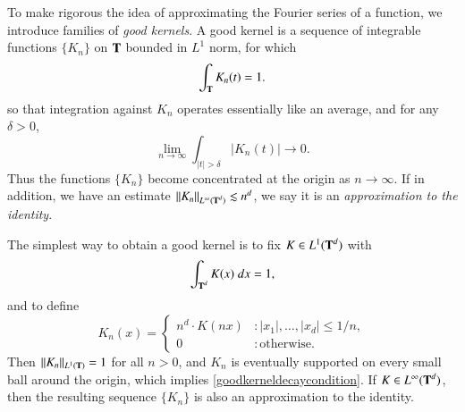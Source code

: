 To make rigorous the idea of approximating the Fourier series of a function, we introduce families of \emph{good kernels}. A good kernel is a sequence of integrable functions $\{ K_n \}$ on $\operatorname{\mathbf{T}}$ bounded in $L^1$ norm, for which
%
\[ \int_{\operatorname{\mathbf{T}}} K_n(t) = 1. \]
%
so that integration against $K_n$ operates essentially like an average, and for any $\delta > 0$,
%
\begin{equation} \label{goodkerneldecaycondition}
    \lim_{n \to \infty} \int_{|t| > \delta} |K_n(t)| \to 0.
\end{equation}
%
Thus the functions $\{ K_n \}$ become concentrated at the origin as $n \to \infty$. If in addition, we have an estimate $\| K_n \|_{L^\infty(\operatorname{\mathbf{T}}^d)} \lesssim n^d$, we say it is an \emph{approximation to the identity}.

\begin{example}
    The simplest way to obtain a good kernel is to fix $K \in L^1(\operatorname{\mathbf{T}}^d)$ with
    \[ \int_{\operatorname{\mathbf{T}}^d} K(x)\; dx = 1, \]
    and to define
    \[ K_n(x) = \begin{cases} n^d \cdot K(nx) &: |x_1|, \dots, |x_d| \leq 1/n, \\ 0 &: \text{otherwise}. \end{cases} \]
    Then $\| K_n \|_{L^1(\operatorname{\mathbf{T}})} = 1$ for all $n > 0$, and $K_n$ is eventually supported on every small ball around the origin, which implies \eqref{goodkerneldecaycondition}. If $K \in L^\infty(\operatorname{\mathbf{T}}^d)$, then the resulting sequence $\{ K_n \}$ is also an approximation to the identity.
\end{example}

